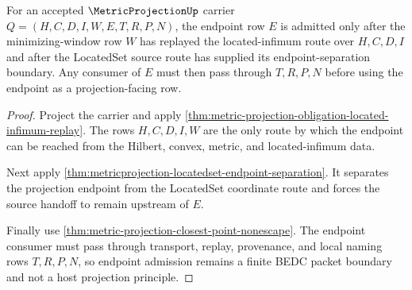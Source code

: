 \begin{theorem}\label{thm:metric-projection-obligation-endpoint-admission}
For an accepted $\MetricProjectionUp$ carrier $Q=(H,C,D,I,W,E,T,R,P,N)$, the endpoint row $E$ is admitted only after the minimizing-window row $W$ has replayed the located-infimum route over $H,C,D,I$ and after the LocatedSet source route has supplied its endpoint-separation boundary. Any consumer of $E$ must then pass through $T,R,P,N$ before using the endpoint as a projection-facing row.
\end{theorem}
\begin{proof}
Project the carrier and apply \autoref{thm:metric-projection-obligation-located-infimum-replay}. The rows $H,C,D,I,W$ are the only route by which the endpoint can be reached from the Hilbert, convex, metric, and located-infimum data.

Next apply \autoref{thm:metricprojection-locatedset-endpoint-separation}. It separates the projection endpoint from the LocatedSet coordinate route and forces the source handoff to remain upstream of $E$.

Finally use \autoref{thm:metric-projection-closest-point-nonescape}. The endpoint consumer must pass through transport, replay, provenance, and local naming rows $T,R,P,N$, so endpoint admission remains a finite BEDC packet boundary and not a host projection principle.
\end{proof}

